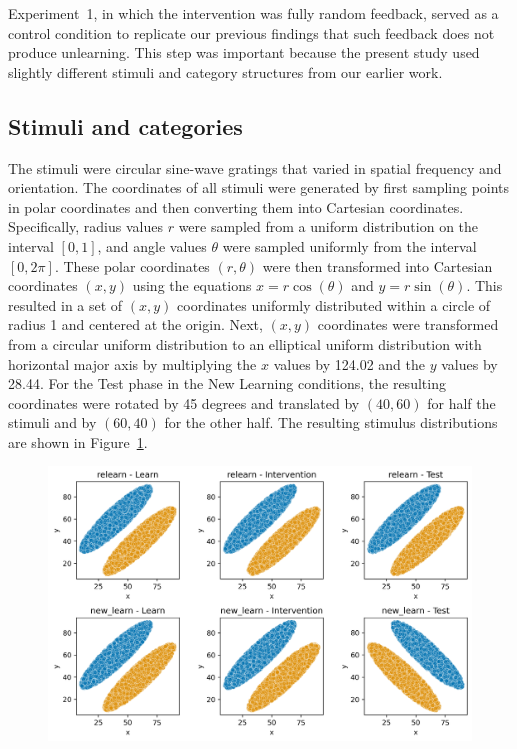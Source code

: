 \documentclass{article}
\begin{document}
Experiment~1, in which the intervention was fully random
feedback, served as a control condition to replicate our
previous findings that such feedback does not produce
unlearning. This step was important because the present
study used slightly different stimuli and category
structures from our earlier work.

\subsection{Stimuli and categories}
The stimuli were circular sine-wave gratings that varied in
spatial frequency and orientation.  The coordinates of all
stimuli were generated by first sampling points in polar
coordinates and then converting them into Cartesian
coordinates.  Specifically, radius values $r$ were sampled
from a uniform distribution on the interval $[0, 1]$, and
angle values $\theta$ were sampled uniformly from the
interval $[0, 2\pi]$.  These polar coordinates $(r, \theta)$
were then transformed into Cartesian coordinates $(x, y)$
using the equations $x = r \cos(\theta)$ and $y =
r\sin(\theta)$. This resulted in a set of $(x, y)$
coordinates uniformly distributed within a circle of radius
1 and centered at the origin. Next, $(x,y)$ coordinates were
transformed from a circular uniform distribution to an
elliptical uniform distribution with horizontal major axis
by multiplying the $x$ values by 124.02 and the $y$ values
by 28.44. For the Test phase in the New Learning conditions,
the resulting coordinates were rotated by 45 degrees and
translated by $(40, 60)$ for half the stimuli and by $(60,
40)$ for the other half. The resulting stimulus
distributions are shown in Figure~\ref{fig_cat}.

\begin{figure}[H]
    \centering
    \includegraphics[width=\textwidth]{../figures/fig_cat_struct.png}
    \caption{}
    \label{fig_cat}
\end{figure}
\end{document}
